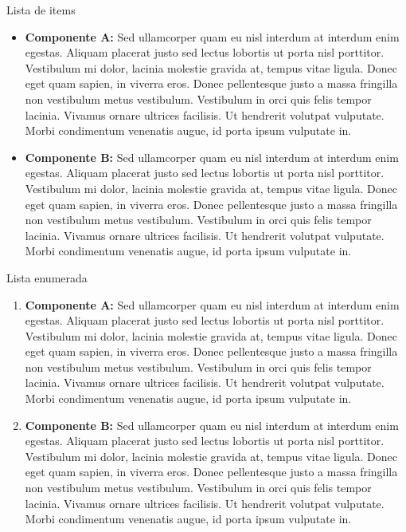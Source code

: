 
Lista de items
\begin{itemize}
	\item \textbf{Componente A:} Sed ullamcorper quam eu nisl interdum at interdum enim egestas. Aliquam placerat justo sed lectus lobortis ut porta nisl porttitor. Vestibulum mi dolor, lacinia molestie gravida at, tempus vitae ligula. Donec eget quam sapien, in viverra eros. Donec pellentesque justo a massa fringilla non vestibulum metus vestibulum. Vestibulum in orci quis felis tempor lacinia. Vivamus ornare ultrices facilisis. Ut hendrerit volutpat vulputate. Morbi condimentum venenatis augue, id porta ipsum vulputate in.
	\item \textbf{Componente B:} Sed ullamcorper quam eu nisl interdum at interdum enim egestas. Aliquam placerat justo sed lectus lobortis ut porta nisl porttitor. Vestibulum mi dolor, lacinia molestie gravida at, tempus vitae ligula. Donec eget quam sapien, in viverra eros. Donec pellentesque justo a massa fringilla non vestibulum metus vestibulum. Vestibulum in orci quis felis tempor lacinia. Vivamus ornare ultrices facilisis. Ut hendrerit volutpat vulputate. Morbi condimentum venenatis augue, id porta ipsum vulputate in.
\end{itemize}

Lista enumerada
\begin{enumerate}
	\item \textbf{Componente A:} Sed ullamcorper quam eu nisl interdum at interdum enim egestas. Aliquam placerat justo sed lectus lobortis ut porta nisl porttitor. Vestibulum mi dolor, lacinia molestie gravida at, tempus vitae ligula. Donec eget quam sapien, in viverra eros. Donec pellentesque justo a massa fringilla non vestibulum metus vestibulum. Vestibulum in orci quis felis tempor lacinia. Vivamus ornare ultrices facilisis. Ut hendrerit volutpat vulputate. Morbi condimentum venenatis augue, id porta ipsum vulputate in.
	\item \textbf{Componente B:} Sed ullamcorper quam eu nisl interdum at interdum enim egestas. Aliquam placerat justo sed lectus lobortis ut porta nisl porttitor. Vestibulum mi dolor, lacinia molestie gravida at, tempus vitae ligula. Donec eget quam sapien, in viverra eros. Donec pellentesque justo a massa fringilla non vestibulum metus vestibulum. Vestibulum in orci quis felis tempor lacinia. Vivamus ornare ultrices facilisis. Ut hendrerit volutpat vulputate. Morbi condimentum venenatis augue, id porta ipsum vulputate in.
\end{enumerate}

